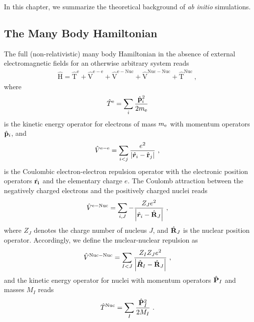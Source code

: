 \documentclass[a4paper,12pt]{book}
\renewcommand{\b}[1]{\boldsymbol{#1}}
\begin{document}
In this chapter, we summarize the theoretical background of {\it ab initio} simulations.

\subsection{The Many Body Hamiltonian}

The full (non-relativistic) many body Hamiltonian in the absence of external electromagnetic fields for an otherwise arbitrary system reads
\begin{align}
    \hat{\mathrm{H}}
        = \hat{\mathrm{T}}^{\mathrm{e}}
        + \hat{\mathrm{V}}^{\mathrm{e}-\mathrm{e}}
        + \hat{\mathrm{V}}^{\mathrm{e}-\mathrm{Nuc}}
        + \hat{\mathrm{V}}^{\mathrm{Nuc}-\mathrm{Nuc}}
        + \hat{\mathrm{T}}^{\mathrm{Nuc}}~,
    \label{eq:Hamiltonian}
\end{align}
where
\begin{align}
    \hat T^{\rm e} 
        =\sum_{i} \frac{\hat{\mathbf{p}}_{i}^{2}}{2 m_{\rm e}}
    \label{eq:Te}
\end{align}
is the kinetic energy operator for electrons of mass $m_{\rm e}$ with momentum operators $\hat{\bf p}_i$, and 
\begin{align}
    \hat V^{\rm e-e}
        = \sum_{i < j} \frac{e^{2}}{\left|\hat{\b r}_{i}-\hat{\bf r}_{j}\right|}~,
    \label{eq:Ve}
\end{align}
is the Coulombic electron-electron repulsion operator with the electronic position operators $\hat{\bf r_i}$ and the elementary charge $e$. 
The Coulomb attraction between the negatively charged electrons and the positively charged nuclei reads
\begin{align}
    \hat V^{\rm e-Nuc}
        = \sum_{i, J} -\frac{Z_J e^{2}}{\left|\hat{\b r}_{i}-\hat{\bf R}_{J}\right|}~,
    \label{eq:Venuc}
\end{align}
where $Z_J$ denotes the charge number of nucleus $J$, and $\hat{\bf R}_J$ is the nuclear position operator. 
Accordingly, we define the nuclear-nuclear repulsion as
\begin{align}
    \hat V^{\rm Nuc-Nuc}
        = \sum_{I < J} \frac{Z_{I} Z_{J} e^{2}}{\left|\hat{\b R}_{I}-\hat{\bf R}_{J}\right|}~,
    \label{eq:Vnuc}
\end{align}
and the kinetic energy operator for nuclei with momentum operators $\hat{\bf P}_I$ and masses $M_I$ reads
\begin{align}
    \hat T^{\rm Nuc} 
        =\sum_{I} \frac{\hat{\mathbf{P}}_{I}^{2}}{2 M_{I}}~.
    \label{eq:Tnuc}
\end{align}
\end{document}
